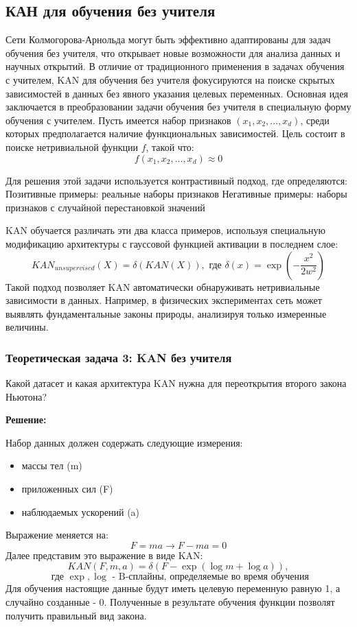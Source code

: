 \subsection{КАН для обучения без учителя}

Сети Колмогорова-Арнольда могут быть эффективно адаптированы для задач обучения без учителя, что открывает новые возможности для анализа данных и научных открытий. В отличие от традиционного применения в задачах обучения с учителем, KAN для обучения без учителя фокусируются на поиске скрытых зависимостей в данных без явного указания целевых переменных.
Основная идея заключается в преобразовании задачи обучения без учителя в специальную форму обучения с учителем. Пусть имеется набор признаков $(x_1, x_2, ..., x_d)$, среди которых предполагается наличие функциональных зависимостей. Цель состоит в поиске нетривиальной функции $f$, такой что:
\[
	f(x_1, x_2, ..., x_d) \approx 0
\]

Для решения этой задачи используется контрастивный подход, где определяются:
Позитивные примеры: реальные наборы признаков
Негативные примеры: наборы признаков с случайной перестановкой значений

KAN обучается различать эти два класса примеров, используя специальную модификацию архитектуры с гауссовой функцией активации в последнем слое:
\[
	KAN_{unsupervised}(X) = \delta (KAN(X)), \text{ где } \delta(x) = \exp(-\frac{x^2}{2w^2})
\]
Такой подход позволяет KAN автоматически обнаруживать нетривиальные зависимости в данных. Например, в физических экспериментах сеть может выявлять фундаментальные законы природы, анализируя только измеренные величины.

\subsubsection{Теоретическая задача 3: KAN без учителя}
Какой датасет и какая архитектура KAN нужна для переоткрытия второго закона Ньютона?

\textbf{Решение:}

Набор данных должен содержать следующие измерения:
\begin{itemize}
	\item массы тел (m)
	\item приложенных сил (F)
	\item наблюдаемых ускорений (a)
\end{itemize}

Выражение меняется на:
\[
	F=ma\rightarrow F-ma=0
\]
Далее представим это выражение в виде KAN:
\[
	KAN(F, m, a) = \delta\left( F-\exp\left( \log m + \log a \right) \right),
\]
\[
	\text{ где } \exp, \log \text{ - B-сплайны, определяемые во время обучения}
\]
Для обучения настоящие данные будут иметь целевую переменную равную 1, а случайно созданные - 0. Полученные в результате обучения функции позволят получить правильный вид закона.



